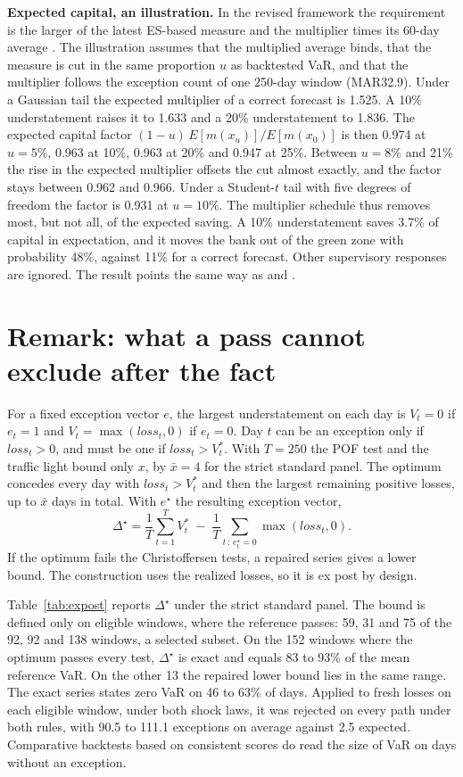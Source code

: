 \documentclass[11pt]{article}
\begin{document}
\textbf{Expected capital, an illustration.} In the revised framework the
requirement is the larger of the latest ES-based measure and the multiplier
times its 60-day average \citep[MAR33.41--33.42]{bcbsmar}. The illustration
assumes that the multiplied average binds, that the measure is cut in the same
proportion $u$ as backtested VaR, and that the multiplier follows the exception
count of one 250-day window (MAR32.9). Under a Gaussian tail the expected
multiplier of a correct forecast is 1.525. A 10\% understatement raises it to
1.633 and a 20\% understatement to 1.836. The expected capital factor $(1-u)\,
E[m(x_u)]/E[m(x_0)]$ is then 0.974 at $u = 5\%$, 0.963 at 10\%, 0.963 at 20\%
and 0.947 at 25\%. Between $u = 8\%$ and 21\% the rise in the expected
multiplier offsets the cut almost exactly, and the factor stays between 0.962
and 0.966. Under a Student-$t$ tail
with five degrees of freedom the factor is 0.931 at $u = 10\%$. The multiplier
schedule thus removes most, but not all, of the expected saving. A 10\%
understatement saves 3.7\% of capital in expectation, and it moves the bank
out of the green zone with probability 48\%, against 11\% for a correct
forecast. Other supervisory responses are ignored. The result points the same
way as
\citet{lucas2001} and \citet{daveiga2012}.

\section{Remark: what a pass cannot exclude after the fact}
\label{sec:expost}

For a fixed exception vector $e$, the largest
understatement on each day is $V_t = 0$ if $e_t = 1$ and $V_t =
\max(\mathit{loss}_t, 0)$ if $e_t = 0$. Day $t$ can be an exception only if
$\mathit{loss}_t > 0$, and must be one if $\mathit{loss}_t > V^*_t$. With
$T = 250$ the POF test and the traffic light bound only $x$, by $\bar{x} = 4$
for the strict standard panel. The optimum concedes every day with
$\mathit{loss}_t > V^*_t$ and then the largest remaining positive losses, up to
$\bar{x}$ days in total. With $e^\star$ the resulting exception vector,
\[
\Delta^\star = \frac{1}{T}\sum_{t=1}^{T} V^*_t \;-\; \frac{1}{T}\sum_{t\,:\,e^\star_t = 0} \max(\mathit{loss}_t, 0).
\]
If the optimum fails the Christoffersen tests, a repaired series gives a lower
bound. The construction uses the realized losses, so it is ex post by design.

Table~\ref{tab:expost} reports $\Delta^\star$ under the strict standard panel.
The bound is defined only on eligible windows, where the reference passes: 59,
31 and 75 of the 92, 92 and 138 windows, a selected subset. On the
152 windows where the optimum passes every test, $\Delta^\star$ is exact and
equals 83 to 93\% of the mean reference VaR. On the other 13 the repaired lower
bound lies in the same range. The exact series states zero VaR on 46 to 63\%
of days. Applied to fresh losses on each eligible window, under both shock
laws, it was rejected on every path under both rules, with 90.5 to 111.1
exceptions on average against 2.5 expected. Comparative backtests based on consistent scores \citep{nolde2017} do read the
size of VaR on days without an exception.
\end{document}
